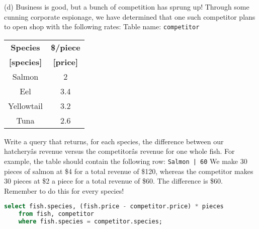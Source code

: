 \documentclass{exam}
\begin{document}
\begin{questions}
\begin{blocksection}
\vspace{10px}
(d) Business is good, but a bunch of competition has sprung up! Through some cunning corporate espionage, we have determined that one such competitor plans to open shop with the following rates:\newline
\newline
Table name: \texttt{competitor}
\begin{center}
\begin{tabular}{ |c|c| }
 \hline
 \textbf{Species} & \textbf{\$/piece} \\
  \textbf{[species]} & \textbf{[price]} \\
 \hline
 Salmon & 2 \\
 \hline
 Eel & 3.4 \\
 \hline
  Yellowtail & 3.2  \\
 \hline
 Tuna & 2.6  \\
 \hline
\end{tabular}
\end{center}
Write a query that returns, for each species, the difference between our hatcheryâs revenue versus the competitorâs revenue for one whole fish. For example, the table should contain the following row: \newline
\texttt{Salmon | 60} \newline \newline
We make 30 pieces of salmon at \$4 for a total revenue of \$120, whereas the competitor makes 30 pieces at \$2 a piece for a total revenue of \$60. The difference is \$60. Remember to do this for every species!
\begin{solution}[1in]
\begin{lstlisting}[language=SQL]
select fish.species, (fish.price - competitor.price) * pieces
    from fish, competitor
    where fish.species = competitor.species;
\end{lstlisting}
\end{solution}


\end{blocksection}

\end{questions}




\end{document}
